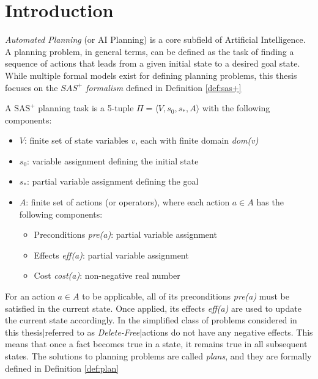 \chapter{Introduction}
\label{ch:intro}
\textit{Automated Planning} (or AI Planning) is a core subfield of Artificial Intelligence.
A planning problem, in general terms, can be defined as the task of finding a sequence
of actions that leads from a given initial state to a desired goal state.
While multiple formal models exist for defining planning problems, this thesis
focuses on the \textit{$SAS^+$ formalism} defined in Definition \ref{def:sas+}

\begin{definition}
	\label{def:sas+}
	A $\text{SAS}^+$ planning task is a 5-tuple $\Pi = \langle V, s_0, s_*, A \rangle$ with
	the following components:
	\begin{itemize}
		\item \(V\): finite set of state variables \(v\),
		      each with finite domain \textit{dom(v)}
		\item \(s_0\): variable assignment defining the initial state
		\item \(s_*\): partial variable assignment defining the goal
		\item \(A\): finite set of actions (or operators),
		      where each action $a \in A$ has the following components:
		      \begin{itemize}
			      \item Preconditions \textit{pre(a)}: partial variable assignment
			      \item Effects \textit{eff(a)}: partial variable assignment
			      \item Cost \textit{cost(a)}: non-negative real number
		      \end{itemize}
	\end{itemize}
\end{definition}

For an action $a \in A$ to be applicable, all of its preconditions
\textit{pre(a)} must be satisfied in the current state. Once applied, its effects
\textit{eff(a)} are used to update the current state accordingly.
In the simplified class of problems considered in this thesis|referred to as \textit{Delete-Free}|actions do not have any negative effects.
This means that once a fact becomes true in a state, it remains true in all subsequent states.
The solutions to planning problems are called \textit{plans}, and they are formally defined in Definition \ref{def:plan}

